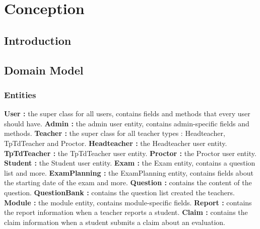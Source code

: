 \documentclass[]{uc2pfecaneva}
\begin{document}
    \setlength{\parskip}{6pt}
    \tableofcontents
    \listoffigures
    \listoftables
    \chapter{Conception}
    \newpage

    \raggedright\section{Introduction}
    \raggedright\section{Domain Model}
    \subsection{Entities}
    \textbf{User :} the super class for all users, contains fields and methods that every user should have.\linebreak
    \textbf{Admin :} the admin user entity, contains admin-specific fields and methods.\linebreak
    \textbf{Teacher :} the super class for all teacher types : Headteacher, TpTdTeacher and Proctor.\linebreak
    \textbf{Headteacher :} the Headteacher user entity.\linebreak
    \textbf{TpTdTeacher :} the TpTdTeacher user entity.\linebreak
    \textbf{Proctor :} the Proctor user entity.\linebreak
    \textbf{Student :} the Student user entity.\linebreak
    \textbf{Exam :} the Exam entity, contains a question list and more.\linebreak
    \textbf{ExamPlanning :} the ExamPlanning entity, contains fields about the starting date of the exam and more.\linebreak
    \textbf{Question :} contains the content of the question.\linebreak
    \textbf{QuestionBank :} contains the question list created the teachers.\linebreak
    \textbf{Module :} the module entity, contains module-specific fields.\linebreak
    \textbf{Report :} contains the report information when a teacher reports a student.\linebreak
    \textbf{Claim :} contains the claim information when a student submits a claim about an evaluation.\linebreak
\end{document}
